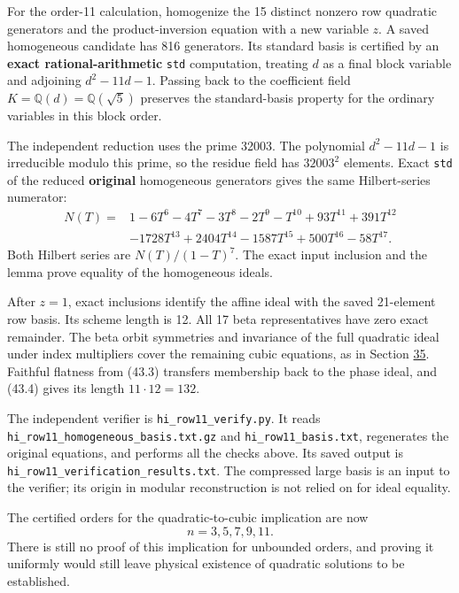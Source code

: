 \documentclass[11pt,reqno]{amsart}
\theoremstyle{plain}
\begin{document}
For the order-11 calculation, homogenize the 15 distinct nonzero row
quadratic generators and the product-inversion equation with a new
variable \(z\). A saved homogeneous candidate has 816 generators.
Its standard basis is certified by an \textbf{exact rational-arithmetic}
\texttt{std} computation, treating \(d\) as a final block variable and
adjoining \(d^2-11d-1\). Passing back to the coefficient field
\(K=\mathbb Q(d)=\mathbb Q(\sqrt5)\) preserves the standard-basis
property for the ordinary variables in this block order.

The independent reduction uses the prime 32003. The polynomial
\(d^2-11d-1\) is irreducible modulo this prime, so the residue field
has \(32003^2\) elements. Exact \texttt{std} of the reduced \textbf{original}
homogeneous generators gives the same Hilbert-series numerator:
\begin{equation*}
\begin{split}
 N(T)={}&1-6T^6-4T^7-3T^8-2T^9-T^{10}
 +93T^{11}+391T^{12}\\
 &-1728T^{13}+2404T^{14}-1587T^{15}
 +500T^{16}-58T^{17}.
\end{split}
\end{equation*}
Both Hilbert series are \(N(T)/(1-T)^7\). The exact input inclusion
and the lemma prove equality of the homogeneous ideals.

After \(z=1\), exact inclusions identify the affine ideal with the
saved 21-element row basis. Its scheme length is 12. All 17 beta
representatives have zero exact remainder. The beta orbit symmetries
and invariance of the full quadratic ideal under index multipliers
cover the remaining cubic equations, as in Section \hyperref[sec:35]{35}. Faithful
flatness from (43.3) transfers membership back to the phase ideal,
and (43.4) gives its length \(11\cdot12=132\).

The independent verifier is \texttt{hi\_\allowbreak row11\_\allowbreak verify.py}. It reads
\texttt{hi\_\allowbreak row11\_\allowbreak homogeneous\_\allowbreak basis.txt.gz} and \texttt{hi\_\allowbreak row11\_\allowbreak basis.txt}, regenerates
the original equations, and performs all the checks above. Its saved
output is \texttt{hi\_\allowbreak row11\_\allowbreak verification\_\allowbreak results.txt}. The compressed large
basis is an input to the verifier; its origin in modular reconstruction
is not relied on for ideal equality.

The certified orders for the quadratic-to-cubic implication are now
\[
 \boxed{n=3,5,7,9,11.}
\]
There is still no proof of this implication for unbounded orders,
and proving it uniformly would still leave physical existence of
quadratic solutions to be established.
\end{document}
